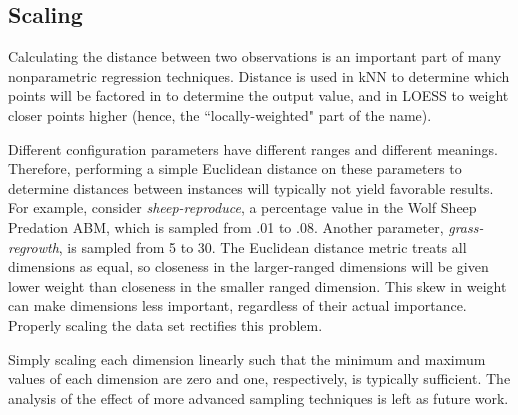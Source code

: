 \subsection{Scaling}

Calculating the distance between two observations is an important part of many nonparametric regression techniques.
Distance is used in kNN to determine which points will  be factored in to determine the output value, and in LOESS to weight closer points higher (hence, the ``locally-weighted" part of the name).

Different configuration parameters have different ranges and different meanings.
Therefore, performing a simple Euclidean distance on these parameters to determine distances between instances will typically not yield favorable results.
For example, consider \textit{sheep-reproduce}, a percentage value in the Wolf Sheep Predation ABM, which is sampled from .01 to .08.
Another parameter, \textit{grass-regrowth}, is sampled from 5 to 30.
The Euclidean distance metric treats all dimensions as equal, so closeness in the larger-ranged dimensions will be given lower weight than closeness in the smaller ranged dimension.
This skew in weight can make dimensions less important, regardless of their actual importance.
Properly scaling the data set rectifies this problem.


Simply scaling each dimension linearly such that the minimum and maximum values of each dimension are zero and one, respectively, is typically sufficient.
The analysis of the effect of more advanced sampling techniques is left as future work.



